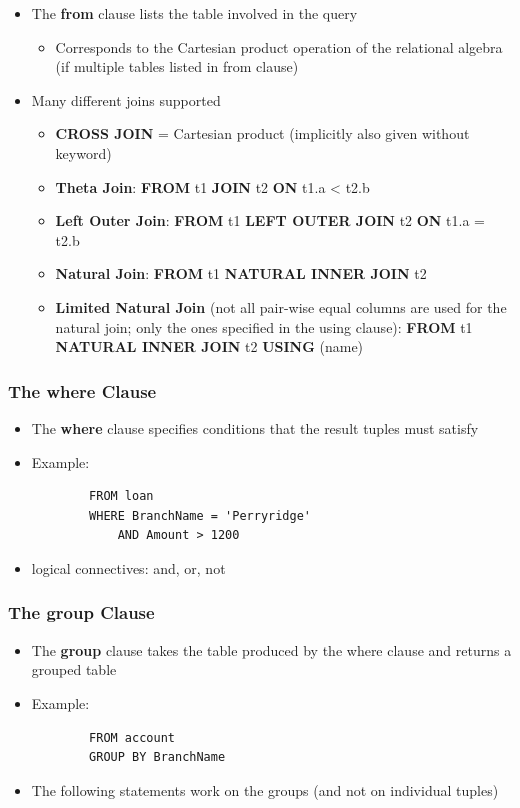 \begin{itemize}[label=\(\rhd\)]
    \item The \textbf{from} clause lists the table involved in the query
    \begin{itemize}[label=\(\rhd\)]
        \item Corresponds to the Cartesian product operation of the relational algebra (if multiple tables listed in from clause)
    \end{itemize}
    \item Many different joins supported
    \begin{itemize}[label=\(\rhd\)]
        \item \textbf{CROSS JOIN} = Cartesian product (implicitly also given without keyword)
        \item \textbf{Theta Join}: \quad \textbf{FROM} t1 \textbf{JOIN} t2 \textbf{ON} t1.a < t2.b
        \item \textbf{Left Outer Join}: \quad \textbf{FROM} t1 \textbf{LEFT OUTER JOIN} t2 \textbf{ON} t1.a = t2.b
        \item \textbf{Natural Join}:  \quad \textbf{FROM} t1 \textbf{NATURAL INNER JOIN} t2 
        \item \textbf{Limited Natural Join} (not all pair-wise equal columns are used for the natural join; only the ones specified in the using clause):  \quad \textbf{FROM} t1 \textbf{NATURAL INNER JOIN} t2 \textbf{USING} (name)
    \end{itemize}
\end{itemize}

\subsubsection{The where Clause}

\begin{itemize}[label=\(\rhd\)]
    \item The \textbf{where} clause specifies conditions that the result tuples must satisfy
    \item Example:
    \begin{lstlisting}
        FROM loan
        WHERE BranchName = 'Perryridge' 
            AND Amount > 1200
    \end{lstlisting}
    \item logical connectives: and, or, not
\end{itemize}

\subsubsection{The group Clause}
\begin{itemize}[label=\(\rhd\)]
    \item The \textbf{group} clause takes the table produced by the where clause and returns a grouped table
    \item Example:
    \begin{lstlisting}
        FROM account
        GROUP BY BranchName
    \end{lstlisting}
    \item The following statements work on the groups (and not on individual tuples)
\end{itemize}

